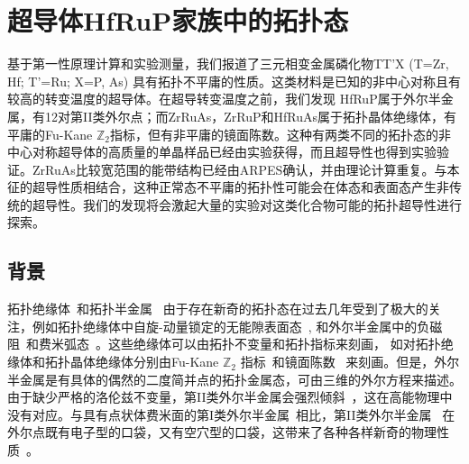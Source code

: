 \chapter{超导体HfRuP家族中的拓扑态}\label{chap:hfrup}


基于第一性原理计算和实验测量，我们报道了三元相变金属磷化物TT'X (T=Zr, Hf; T'=Ru; X=P, As) 具有拓扑不平庸的性质。这类材料是已知的非中心对称且有较高的转变温度的超导体。在超导转变温度之前，我们发现
HfRuP属于外尔半金属，有12对第II类外尔点；而ZrRuAs，ZrRuP和HfRuAs属于拓扑晶体绝缘体，有平庸的Fu-Kane $\mathbb Z_2$指标，但有非平庸的镜面陈数。这种有两类不同的拓扑态的非中心对称超导体的高质量的单晶样品已经由实验获得，而且超导性也得到实验验证。ZrRuAs比较宽范围的能带结构已经由ARPES确认，并由理论计算重复。与本征的超导性质相结合，这种正常态不平庸的拓扑性可能会在体态和表面态产生非传统的超导性。我们的发现将会激起大量的实验对这类化合物可能的拓扑超导性进行探索。


\section{背景}
    
拓扑绝缘体~\citep{TIreview,qi2011}和拓扑半金属~\citep{Wan2011,xu2011chern,wang2012dirac,wang2013three,weng2015weyl} 由于存在新奇的拓扑态在过去几年受到了极大的关注，例如拓扑绝缘体中自旋-动量锁定的无能隙表面态~\citep{PhysRevLett.106.257004,zhang2013spin}, 和外尔半金属中的负磁阻~\citep{weng2015weyl,huang2015observation,zhang2016signatures}和费米弧态~\citep{xu2016observation,xu2015discovery,wang2016observation2}。这些绝缘体可以由拓扑不变量和拓扑指标来刻画， 如对拓扑绝缘体和拓扑晶体绝缘体分别由Fu-Kane $\mathbb Z_2$ 指标~\citep{Fu2007topo}和镜面陈数~\citep{hsieh2012topological,nie2016band} 来刻画。但是，外尔半金属是有具体的偶然的二度简并点的拓扑金属态，可由三维的外尔方程来描述。由于缺少严格的洛伦兹不变量，第II类外尔半金属会强烈倾斜~\citep{soluyanov2015type}，这在高能物理中没有对应。与具有点状体费米面的第I类外尔半金属~\citep{weng2015weyl,huang2015weyl,lv2015experimental,lv2015observation,lv2015observation2,nie2017topological,nie2019magnetic,PhysRevLett.117.236401}相比，第II类外尔半金属~\citep{deng2016experimental,jiang2017signature,tamai2016fermi,liang2016electronic,wang2016mote} 在外尔点既有电子型的口袋，又有空穴型的口袋，这带来了各种各样新奇的物理性质~\citep{kumar2017extremely,shekhar2015extremely}。
    
